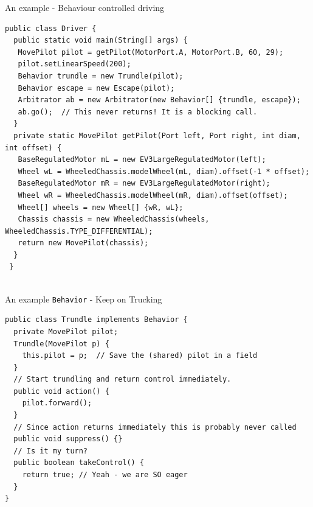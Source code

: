 \documentclass[color=pdftex,usenames,dvipsnames, aspectratio=169]{beamer}
\begin{document}
\begin{frame}[fragile]{An example - Behaviour controlled driving}
\begin{lstlisting}[basicstyle=\ttfamily\scriptsize\color{blue}, xleftmargin=0in, linewidth=14cm,emph={pilot, Behavior,Arbitrator,go}]
public class Driver {
  public static void main(String[] args) {
   MovePilot pilot = getPilot(MotorPort.A, MotorPort.B, 60, 29);
   pilot.setLinearSpeed(200);
   Behavior trundle = new Trundle(pilot);
   Behavior escape = new Escape(pilot);
   Arbitrator ab = new Arbitrator(new Behavior[] {trundle, escape});
   ab.go();  // This never returns! It is a blocking call.
  }
  private static MovePilot getPilot(Port left, Port right, int diam, int offset) {
   BaseRegulatedMotor mL = new EV3LargeRegulatedMotor(left);
   Wheel wL = WheeledChassis.modelWheel(mL, diam).offset(-1 * offset); 
   BaseRegulatedMotor mR = new EV3LargeRegulatedMotor(right);
   Wheel wR = WheeledChassis.modelWheel(mR, diam).offset(offset);
   Wheel[] wheels = new Wheel[] {wR, wL};
   Chassis chassis = new WheeledChassis(wheels, WheeledChassis.TYPE_DIFFERENTIAL);
   return new MovePilot(chassis);
  }
 }
 
\end{lstlisting}
\end{frame}
%
\begin{frame}[fragile]{An example \lstinline!Behavior! - Keep on Trucking}
\begin{lstlisting}[basicstyle=\ttfamily\scriptsize\color{blue}, xleftmargin=0in, linewidth=11cm,emph={pilot, private, Behavior,suppress,takeControl,action}]
public class Trundle implements Behavior {
  private MovePilot pilot;
  Trundle(MovePilot p) {
    this.pilot = p;  // Save the (shared) pilot in a field
  }
  // Start trundling and return control immediately.
  public void action() {
    pilot.forward();
  }
  // Since action returns immediately this is probably never called
  public void suppress() {}
  // Is it my turn?
  public boolean takeControl() {
    return true; // Yeah - we are SO eager
  }
}
\end{lstlisting}
\end{frame}
\end{document}
